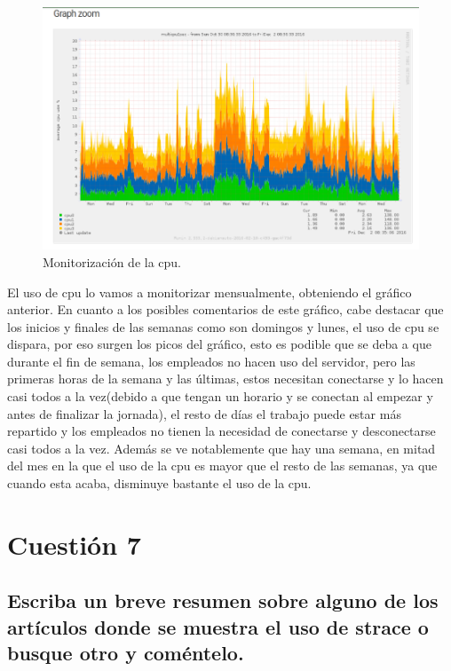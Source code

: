 \begin{figure}[H] %
	\centering
	\includegraphics[scale=0.5]{imagenes/uso-cpu.png}  %
	\caption{Monitorización de la cpu.}
\end{figure}

El uso de cpu lo vamos a monitorizar mensualmente, obteniendo el gráfico anterior.
En cuanto a los posibles comentarios de este gráfico, cabe destacar que los inicios y finales de las semanas como son domingos y lunes, el uso de cpu se dispara, por eso surgen los picos del gráfico, esto es podible que se deba a que durante el fin de semana, los empleados no hacen uso del servidor, pero las primeras horas de la semana y las últimas, estos necesitan conectarse y lo hacen casi todos a la vez(debido a que tengan un horario y se conectan al empezar y antes de finalizar la jornada), el resto de días el trabajo puede estar más repartido y los empleados no tienen la necesidad de conectarse y desconectarse casi todos a la vez.
Además se ve notablemente que hay una semana, en mitad del mes en la que el uso de la cpu es mayor que el resto de las semanas, ya que cuando esta acaba, disminuye bastante el uso de la cpu.

\section{Cuestión 7}

\subsection{\Large Escriba un breve resumen sobre alguno de los artículos donde se muestra el uso de strace o busque otro y coméntelo.}

